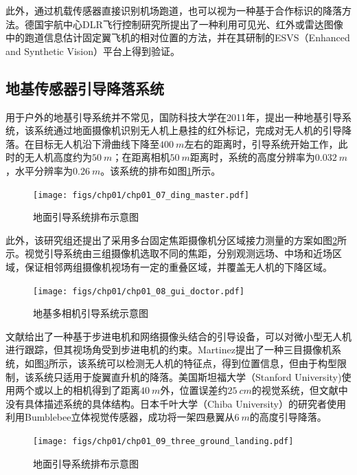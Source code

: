 此外，通过机载传感器直接识别机场跑道，也可以视为一种基于合作标识的降落方法。德国宇航中心DLR飞行控制研究所提出了一种利用可见光、红外或雷达图像中的跑道信息估计固定翼飞机的相对位置的方法，并在其研制的ESVS（Enhanced and Synthetic Vision）平台上得到验证\cite{doehler2003robust}。

\subsection{地基传感器引导降落系统} 

用于户外的地基引导系统并不常见，国防科技大学在2011年，提出一种地基引导系统\cite{Ding_master_2011}，该系统通过地面摄像机识别无人机上悬挂的红外标记，完成对无人机的引导降落。在目标无人机沿下滑曲线下降至$400\ m$左右的距离时，引导系统开始工作，此时的无人机高度约为$50\ m$；在距离相机$50\ m$距离时，系统的高度分辨率为$0.032\ m$，水平分辨率为$0.26\ m$。该系统的排布如图\ref{fig:chp01_07_ding_master}所示。

\begin{figure}[htb]   
	\centering
	\texttt{[image: figs/chp01/chp01\_07\_ding\_master.pdf]}
	\caption{地面引导系统排布示意图\cite{Ding_master_2011}}
	\label{fig:chp01_07_ding_master}
\end{figure}

此外，该研究组还提出了采用多台固定焦距摄像机分区域接力测量的方案如图\ref{fig:chp01_08_gui_doctor}所示\cite{gui_doctor_2013}。视觉引导系统由三组摄像机选取不同的焦距，分别观测远场、中场和近场区域，保证相邻两组摄像机视场有一定的重叠区域，并覆盖无人机的下降区域。

\begin{figure}[htb]   
	\centering
	\texttt{[image: figs/chp01/chp01\_08\_gui\_doctor.pdf]}
	\caption{地基多相机引导系统示意图\cite{gui_doctor_2013}}
	\label{fig:chp01_08_gui_doctor}
\end{figure}

文献\cite{Garcia-Pardo2002}给出了一种基于步进电机和网络摄像头结合的引导设备，可以对微小型无人机进行跟踪，但其视场角受到步进电机的约束。Martinez\cite{Martinez2010}提出了一种三目摄像机系统，如图\ref{fig:chp01_09_three_ground_landing}所示，该系统可以检测无人机的特征点，得到位置信息，但由于构型限制，该系统只适用于旋翼直升机的降落。美国斯坦福大学（Stanford University)\cite{Saripalli2003}使用两个或以上的相机得到了距离$40\ m$外，位置误差约$25\ cm$的视觉系统，但文献中没有具体描述系统的具体结构。日本千叶大学（Chiba University）的研究者\cite{PEBRIANTI2010}使用利用Bumblebee立体视觉传感器，成功将一架四悬翼从$6\ m$的高度引导降落。

\begin{figure}[htb]   
	\centering
	\texttt{[image: figs/chp01/chp01\_09\_three\_ground\_landing.pdf]}
	\caption{地面引导系统排布示意图\cite{Martinez2010}}
	\label{fig:chp01_09_three_ground_landing}
\end{figure}

